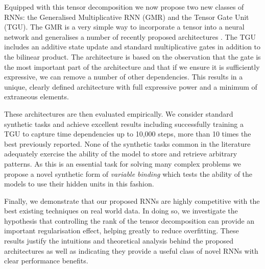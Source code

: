 Equipped with this tensor decomposition we now propose two new classes of RNNs: the Generalised
Multiplicative RNN (GMR) and the Tensor Gate Unit (TGU).
The GMR is a very simple way to incorporate a tensor into a neural network and generalises a number of
recently proposed architectures \autocite{Martens2011a, Wu2016}. The TGU includes an
additive state update and standard multiplicative gates in addition to the bilinear product. 
The architecture is based on the observation that the gate is the most important part of the architecture
and that if we ensure it is sufficiently expressive, we can remove a number of other dependencies. This
results in a unique, clearly defined architecture with full expressive power and a minimum of extraneous
elements.

These architectures are then evaluated empirically. We consider standard synthetic tasks and achieve
excellent results including successfully training a TGU to capture time dependencies up to 10,000 steps,
more than 10 times the best previously reported. None of the synthetic tasks common in the
literature adequately exercise the ability of the model to store and retrieve arbitrary patterns.
As this is an essential task for solving many complex problems we propose a novel synthetic
form of \emph{variable binding} which tests the ability of the models to use their hidden units in this
fashion.

Finally, we demonstrate that our proposed RNNs are highly competitive with the best existing techniques
on real world data. In doing so, we investigate the hypothesis that controlling the rank of the tensor
decomposition can provide an important regularisation effect, helping greatly to reduce overfitting.
These results justify the intuitions and theoretical analysis behind the proposed architectures
as well as indicating they provide a useful class of novel RNNs with clear performance benefits.
